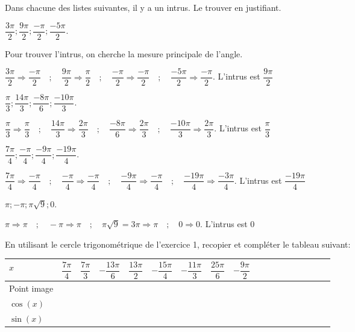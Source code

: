 \documentclass[11pt,a4paper]{article}  %
\begin{document}
Dans chacune des listes suivantes, il y a un intrus. Le trouver en justifiant.
\begin{enumMet}
	\item $\dfrac{3 \pi}{2} ; \dfrac{9 \pi}{2} ; \dfrac{-\pi}{2} ; \dfrac{-5 \pi}{2}$.
	\begin{corrBox}
		Pour trouver l'intrus, on cherche la mesure principale de l'angle.
		
		$\dfrac{3 \pi}{2} \Rightarrow \dfrac{-\pi}{2} \quad;\quad \dfrac{9 \pi}{2} \Rightarrow \dfrac{\pi}{2} \quad;\quad \dfrac{-\pi}{2} \Rightarrow \dfrac{-\pi}{2} \quad;\quad \dfrac{-5 \pi}{2} \Rightarrow \dfrac{-\pi}{2}$. L'intrus est $\dfrac{9 \pi}{2}$
	\end{corrBox}
	\item $\dfrac{\pi}{3} ; \dfrac{14 \pi}{3} ; \dfrac{-8 \pi}{6} ; \dfrac{-10 \pi}{3}$.
	\begin{corrBox}
		$\dfrac{\pi}{3} \Rightarrow \dfrac{\pi}{3} \quad;\quad \dfrac{14 \pi}{3} \Rightarrow \dfrac{2 \pi}{3} \quad;\quad \dfrac{-8 \pi}{6} \Rightarrow \dfrac{2 \pi}{3} \quad;\quad \dfrac{-10 \pi}{3} \Rightarrow \dfrac{2 \pi}{3}$. L'intrus est $\dfrac{\pi}{3}$
	\end{corrBox}
	\item $\dfrac{7 \pi}{4} ; \dfrac{-\pi}{4} ; \dfrac{-9 \pi}{4} ; \dfrac{-19 \pi}{4}$.
	\begin{corrBox}
		$\dfrac{7 \pi}{4} \Rightarrow \dfrac{-\pi}{4} \quad;\quad \dfrac{-\pi}{4} \Rightarrow \dfrac{-\pi}{4} \quad;\quad \dfrac{-9 \pi}{4} \Rightarrow \dfrac{-\pi}{4} \quad;\quad \dfrac{-19 \pi}{4} \Rightarrow \dfrac{-3 \pi}{4}$. L'intrus est $\dfrac{-19 \pi}{4}$
	\end{corrBox}
	\item $\pi ;-\pi ; \pi \sqrt{9} ; 0$.
	\begin{corrBox}
		$\pi \Rightarrow \pi \quad;\quad -\pi \Rightarrow \pi \quad;\quad \pi \sqrt{9}=3 \pi \Rightarrow \pi \quad;\quad 0 \Rightarrow 0$. L'intrus est $0$
	\end{corrBox}
\end{enumMet}


En utilisant le cercle trigonométrique de l'exercice 1, recopier et compléter le tableau suivant:\\
\begin{center}
	\begin{tabular}{ | Xc | Xc | Xc | Xc | Xc | Xc | Xc | Xc | Xc |}
		\hline
		$x$  & $\dfrac{7\pi}{4}$ & $\dfrac{7\pi}{3}$ & $-\dfrac{13\pi}{6}$ &  $\dfrac{13\pi}{2}$ & $-\dfrac{15\pi}{4}$ & $-\dfrac{11\pi}{3}$ & $\dfrac{25\pi}{6}$ &  $-\dfrac{9\pi}{2}$ \rule[-12pt]{0pt}{33pt}\\ \hline
		Point image  &   &   &   &  &   &   &   &  \\ \hline
		$\cos(x)$  &   &   &   &  &   &   &   &  \\ \hline
		$\sin(x)$ &   &   &   &  &   &   &   &  \\
		\hline  
	\end{tabular}
\end{center}
\end{document}
